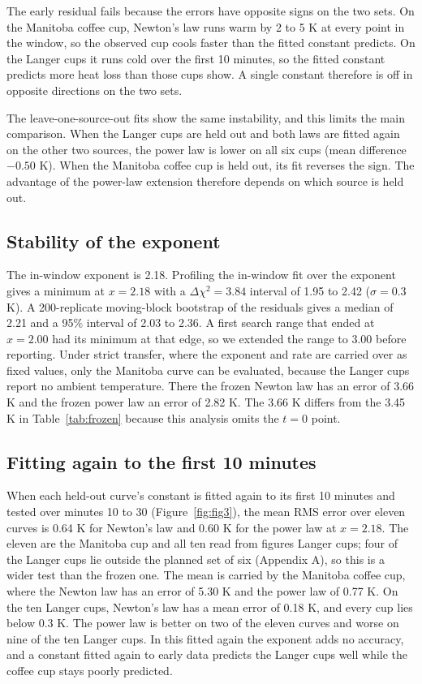 \documentclass[11pt,letterpaper]{article}
\begin{document}
The early residual fails because the errors have opposite signs on the two sets. On the Manitoba coffee cup, Newton's law runs warm by 2 to 5 K at every point in the window, so the observed cup cools faster than the fitted constant predicts. On the Langer cups it runs cold over the first 10 minutes, so the fitted constant predicts more heat loss than those cups show. A single constant therefore is off in opposite directions on the two sets.

The leave-one-source-out fits show the same instability, and this limits the main comparison. When the Langer cups are held out and both laws are fitted again on the other two sources, the power law is lower on all six cups (mean difference $-0.50$ K). When the Manitoba coffee cup is held out, its fit reverses the sign. The advantage of the power-law extension therefore depends on which source is held out.

\subsection{Stability of the exponent}\label{sec:exponent}

The in-window exponent is 2.18. Profiling the in-window fit over the exponent gives a minimum at $x = 2.18$ with a $\Delta\chi^2 = 3.84$ interval of 1.95 to 2.42 ($\sigma = 0.3$ K). A 200-replicate moving-block bootstrap of the residuals gives a median of 2.21 and a 95\% interval of 2.03 to 2.36. A first search range that ended at $x = 2.00$ had its minimum at that edge, so we extended the range to 3.00 before reporting. Under strict transfer, where the exponent and rate are carried over as fixed values, only the Manitoba curve can be evaluated, because the Langer cups report no ambient temperature. There the frozen Newton law has an error of 3.66 K and the frozen power law an error of 2.82 K. The 3.66 K differs from the 3.45 K in Table~\ref{tab:frozen} because this analysis omits the $t = 0$ point.

\subsection{Fitting again to the first 10 minutes}\label{sec:fitted again}

When each held-out curve's constant is fitted again to its first 10 minutes and tested over minutes 10 to 30 (Figure~\ref{fig:fig3}), the mean RMS error over eleven curves is 0.64 K for Newton's law and 0.60 K for the power law at $x = 2.18$. The eleven are the Manitoba cup and all ten read from figures Langer cups; four of the Langer cups lie outside the planned set of six (Appendix A), so this is a wider test than the frozen one. The mean is carried by the Manitoba coffee cup, where the Newton law has an error of 5.30 K and the power law of 0.77 K. On the ten Langer cups, Newton's law has a mean error of 0.18 K, and every cup lies below 0.3 K. The power law is better on two of the eleven curves and worse on nine of the ten Langer cups. In this fitted again the exponent adds no accuracy, and a constant fitted again to early data predicts the Langer cups well while the coffee cup stays poorly predicted.
\end{document}
